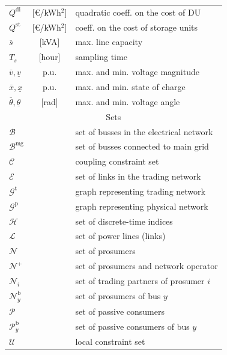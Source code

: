 \documentclass{IEEEtran}  %
\newcommand{\mc}{\mathcal}
\newcommand{\0}{\mathbf{0}}
\newcommand{\1}{\mathbf{1}}
\begin{document}
\begin{table}[!h]
\begin{tabular}{l c l}
		$Q^{\mathrm{di}}$ &[\euro/kWh$^2$] & quadratic coeff. on the cost of DU \\
		$Q^{\mathrm{st}}$ & [\euro/kWh$^2$]& coeff. on the cost of storage units \\
		$\overline{s}$ & [kVA] & max. line capacity \\
		$T_s$ & [hour] & sampling time \\
		$\overline{v}, \underline{v}$ & p.u. & max. and min. voltage magnitude \\
		$\overline{x},\underline{x}$ &p.u. & max. and min. state of charge \\
		$\overline{\theta}, \underline{\theta}$ & [rad] & max. and min. voltage angle \\
		\hline
		\toprule
		\multicolumn{3}{c}{Sets}  \\
		\hline 
		$\mc B$ & & set of busses in the electrical network \\
		$\mc B^{\mathrm{mg}}$ & & set of busses connected to main grid\\
		$\mathcal{C}$ & & coupling constraint set \\
		$\mc E$ & & set of links in the trading network\\
		$\mathcal{G}^{\mathrm{t}}$ & & graph representing trading network \\
		$\mathcal{G}^{\mathrm{p}}$ & & graph representing physical network \\
		$\mc H$ & & set of discrete-time indices \\
		$\mc L$ & & set of power lines (links)\\
		$\mathcal{N}$ & & set of prosumers \\
		$\mathcal{N}^+$ & & set of prosumers and network operator\\
		$\mathcal{N}_i$ & & set of trading partners of prosumer $i$ \\
		$\mathcal{N}_y^{\mathrm{b}}$ & & set of prosumers of bus $y$ \\
		$\mc P$ & & set of passive consumers \\
		$\mc P_y^{\mathrm{b}}$& &set of passive consumers of bus $y$ \\
		$\mathcal{U}$ & & local constraint set \\ 
		\bottomrule
		
	\end{tabular}
	
\end{table}
\end{document}
